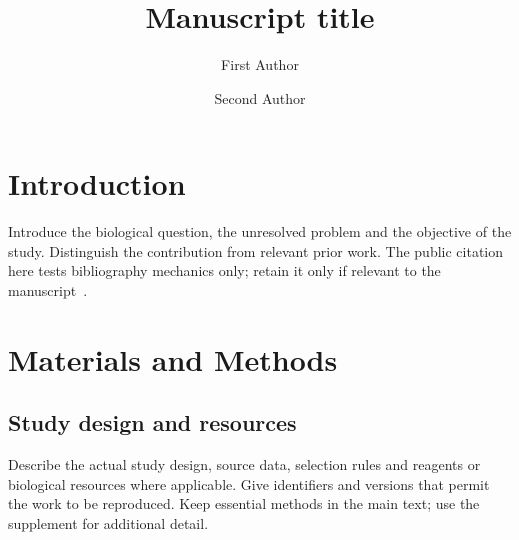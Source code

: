 \documentclass[unnumsec,webpdf,modern,large]{oup-authoring-template}
\begin{document}
\DOI{}
\copyrightyear{}
\pubyear{}

\title[Short manuscript title]{Manuscript title}
\author[1,$\ast$]{First Author}
\author[1,2]{Second Author}
\address[1]{, ,
  }
\address[2]{, ,
  }

\maketitle
\thispagestyle{plain}
\pagestyle{plain}

\section{Introduction}\label{sec:introduction}
Introduce the biological question, the unresolved problem and the objective
of the study. Distinguish the contribution from relevant prior work.
The public citation here tests bibliography mechanics only; retain it only
if relevant to the manuscript~\cite{wilkinson2016fair}.

\section{Materials and Methods}\label{sec:methods}
\subsection{Study design and resources}
Describe the actual study design, source data, selection rules and
reagents or biological resources where applicable. Give identifiers and
versions that permit the work to be reproduced. Keep essential methods
in the main text; use the supplement for additional detail.
\end{document}
